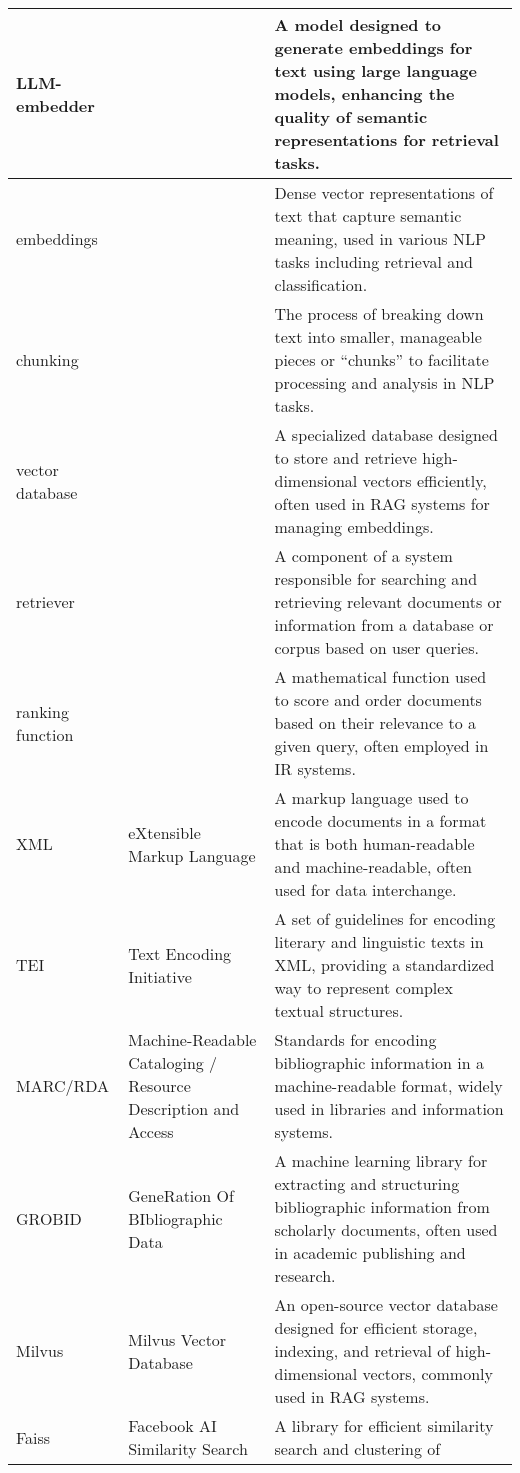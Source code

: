 \begin{tabularx}{\textwidth}{
  >{\raggedright\arraybackslash}p{2.5cm}
  >{\raggedright\arraybackslash}p{4cm}
  >{\noindent\justifying\arraybackslash}X
}
\cmidrule(lr){1-3}
LLM-embedder &   & A model designed to generate embeddings for text using large language models, enhancing the quality of semantic representations for retrieval tasks. \\
\cmidrule(lr){1-3}
embeddings &    & Dense vector representations of text that capture semantic meaning, used in various NLP tasks including retrieval and classification. \\
\cmidrule(lr){1-3}
chunking &    & The process of breaking down text into smaller, manageable pieces or ``chunks'' to facilitate processing and analysis in NLP tasks. \\
\cmidrule(lr){1-3}
vector database &    & A specialized database designed to store and retrieve high-dimensional vectors efficiently, often used in RAG systems for managing embeddings. \\
\cmidrule(lr){1-3}
retriever &    & A component of a system responsible for searching and retrieving relevant documents or information from a database or corpus based on user queries. \\
\cmidrule(lr){1-3}
ranking function &    & A mathematical function used to score and order documents based on their relevance to a given query, often employed in IR systems. \\
\cmidrule(lr){1-3}
XML & eXtensible Markup Language & A markup language used to encode documents in a format that is both human-readable and machine-readable, often used for data interchange. \\
\cmidrule(lr){1-3}
TEI & Text Encoding Initiative & A set of guidelines for encoding literary and linguistic texts in XML, providing a standardized way to represent complex textual structures. \\
\cmidrule(lr){1-3} 
MARC/RDA & Machine-Readable Cataloging / Resource Description and Access & Standards for encoding bibliographic information in a machine-readable format, widely used in libraries and information systems. \\
\cmidrule(lr){1-3}
GROBID & GeneRation Of BIbliographic Data & A machine learning library for extracting and structuring bibliographic information from scholarly documents, often used in academic publishing and research. \\
\cmidrule(lr){1-3}
Milvus & Milvus Vector Database & An open-source vector database designed for efficient storage, indexing, and retrieval of high-dimensional vectors, commonly used in RAG systems. \\
\cmidrule(lr){1-3}
Faiss  & Facebook AI Similarity Search & A library for efficient similarity search and clustering of

\end{tabularx}
